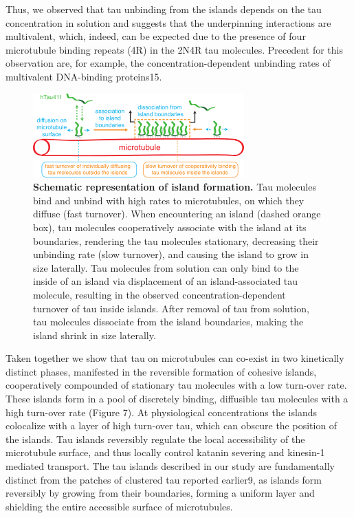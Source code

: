 Thus, we observed that tau unbinding from the islands depends on the tau concentration in solution and suggests that the underpinning interactions are multivalent, which, indeed, can be expected due to the presence of four microtubule binding repeats (4R) in the 2N4R tau molecules. Precedent for this observation are, for example, the concentration-dependent unbinding rates of multivalent DNA-binding proteins15.


\begin{figure}[h!tb]
\centering
\includegraphics[scale=1]{Figures/tau8.png}
\caption[Schematic representation of island formation.]{
\textbf{Schematic representation of island formation.} Tau molecules bind and unbind with high rates to microtubules, on which they diffuse (fast turnover). When encountering an island (dashed orange box), tau molecules cooperatively associate with the island at its boundaries, rendering the tau molecules stationary, decreasing their unbinding rate (slow turnover), and causing the island to grow in size laterally. Tau molecules from solution can only bind to the inside of an island via displacement of an island-associated tau molecule, resulting in the observed concentration-dependent turnover of tau inside islands. After removal of tau from solution, tau molecules dissociate from the island boundaries, making the island shrink in size laterally.
	}\label{tau8}
\end{figure}
Taken together we show that tau on microtubules can co-exist in two kinetically distinct phases, manifested in the reversible formation of cohesive islands, cooperatively compounded of stationary tau molecules with a low turn-over rate. These islands form in a pool of discretely binding, diffusible tau molecules with a high turn-over rate (Figure 7). At physiological concentrations the islands colocalize with a layer of high turn-over tau, which can obscure the position of the islands. Tau islands reversibly regulate the local accessibility of the microtubule surface, and thus locally control katanin severing and kinesin-1 mediated transport. The tau islands described in our study are fundamentally distinct from the patches of clustered tau reported earlier9, as islands form reversibly by growing from their boundaries, forming a uniform layer and shielding the entire accessible surface of microtubules.
